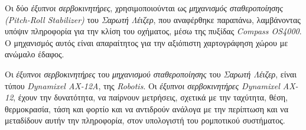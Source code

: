 \bigskip
Οι δύο \textit{έξυπνοι σερβοκινητήρες}, χρησιμοποιούνται ως \textit{μηχανισμός σταθεροποίησης (Pitch-Roll Stabilizer)} του \textit{Σαρωτή Λέιζερ}, που αναφέρθηκε παραπάνω, λαμβάνοντας υπόψιν πληροφορία για την κλίση του οχήματος, μέσω της πυξίδας \textit{Compass OS4000}. Ο μηχανισμός αυτός είναι απαραίτητος για την αξιόπιστη χαρτογράφηση χώρου με ανώμαλο έδαφος.

\bigskip
Οι \textit{έξυπνοι σερβοκινητήρες} του \textit{μηχανισμού σταθεροποίησης} του \textit{Σαρωτή Λέιζερ}, είναι τύπου \textit{Dynamixel AX-12A}, της \textit{Robotis}. Οι \textit{έξυπνοι σερβοκινητήρες Dynamixel AX-12}, έχουν την δυνατότητα, να παίρνουν μετρήσεις, σχετικά με την ταχύτητα, θέση, θερμοκρασία, τάση και φορτίο και να αντιδρούν ανάλογα με την περίπτωση και να μεταδίδουν αυτήν την πληροφορία, στον υπολογιστή του ρομποτικού συστήματος.

